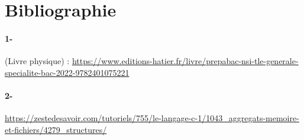 \documentclass[a4paper, 12pt]{article}
\begin{document}
    

\appendix  %
\section{Bibliographie}
\paragraph{1- }
(Livre physique) : \url{https://www.editions-hatier.fr/livre/prepabac-nsi-tle-generale-specialite-bac-2022-9782401075221}
\paragraph{2- }
\url{https://zestedesavoir.com/tutoriels/755/le-langage-c-1/1043_aggregats-memoire-et-fichiers/4279_structures/}
\end{document}
